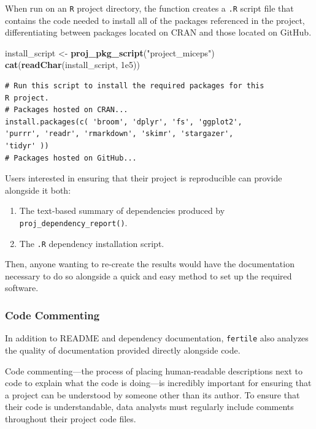 \documentclass[12pt,twoside]{reedthesis}
\newenvironment{Shaded}{\begin{snugshade}}{\end{snugshade}}
\newcommand{\KeywordTok}[1]{\textcolor[rgb]{0.13,0.29,0.53}{\textbf{#1}}}
\newcommand{\FloatTok}[1]{\textcolor[rgb]{0.00,0.00,0.81}{#1}}
\newcommand{\StringTok}[1]{\textcolor[rgb]{0.31,0.60,0.02}{#1}}
\newcommand{\NormalTok}[1]{#1}
\providecommand{\tightlist}{%
  \setlength{\itemsep}{0pt}\setlength{\parskip}{0pt}}
\begin{document}
When run on an \texttt{R} project directory, the function creates a
\texttt{.R} script file that contains the code needed to install all of
the packages referenced in the project, differentiating between packages
located on CRAN and those located on GitHub.
\begin{Shaded}
\begin{Highlighting}[]
\NormalTok{install_script <-}\StringTok{ }\KeywordTok{proj_pkg_script}\NormalTok{(}\StringTok{"project_miceps"}\NormalTok{)}
\KeywordTok{cat}\NormalTok{(}\KeywordTok{readChar}\NormalTok{(install_script, }\FloatTok{1e5}\NormalTok{))}
\end{Highlighting}
\end{Shaded}
\begin{verbatim}
# Run this script to install the required packages for this
R project.
# Packages hosted on CRAN...
install.packages(c( 'broom', 'dplyr', 'fs', 'ggplot2',
'purrr', 'readr', 'rmarkdown', 'skimr', 'stargazer',
'tidyr' ))
# Packages hosted on GitHub...
\end{verbatim}
Users interested in ensuring that their project is reproducible can
provide alongside it both:
\begin{enumerate}
\def\labelenumi{\arabic{enumi}.}
\tightlist
\item
  The text-based summary of dependencies produced by
  \texttt{proj\_dependency\_report()}.
\item
  The \texttt{.R} dependency installation script.
\end{enumerate}
Then, anyone wanting to re-create the results would have the
documentation necessary to do so alongside a quick and easy method to
set up the required software.

\subsubsection{Code Commenting}\label{code-commenting}

In addition to README and dependency documentation, \texttt{fertile}
also analyzes the quality of documentation provided directly alongside
code.

Code commenting---the process of placing human-readable descriptions
next to code to explain what the code is doing---is incredibly important
for ensuring that a project can be understood by someone other than its
author. To ensure that their code is understandable, data analysts must
regularly include comments throughout their project code files.
\end{document}
